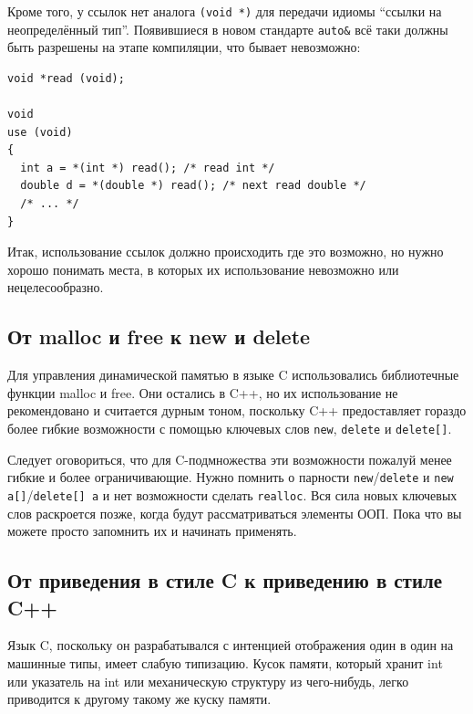 \documentclass[a4paper,12pt,oneside]{article}
\begin{document}
Кроме того, у ссылок нет аналога \lstinline!(void *)! для передачи идиомы ``ссылки на неопределённый тип''. Появившиеся в новом стандарте \lstinline!auto&! всё таки должны быть разрешены на этапе компиляции, что бывает невозможно:

\begin{lstlisting}
void *read (void);

void 
use (void)
{
  int a = *(int *) read(); /* read int */
  double d = *(double *) read(); /* next read double */
  /* ... */
}
\end{lstlisting}

Итак, использование ссылок должно происходить где это возможно, но нужно хорошо понимать места, в которых их использование невозможно или нецелесообразно.

\subsection{От malloc и free к new и delete\label{newdelete}}

Для управления динамической памятью в языке C использовались библиотечные функции malloc и free. Они остались в C++, но их использование не рекомендовано и считается дурным тоном, поскольку C++ предоставляет гораздо более гибкие возможности с помощью ключевых слов \lstinline!new!, \lstinline!delete! и \lstinline!delete[]!.



Следует оговориться, что для C-подмножества эти возможности пожалуй менее гибкие и более ограничивающие. Нужно помнить о парности \lstinline!new!/\lstinline!delete! и \lstinline!new a[]!/\lstinline!delete[] a! и нет возможности сделать \lstinline!realloc!. Вся сила новых ключевых слов раскроется позже, когда будут рассматриваться элементы ООП. Пока что вы можете просто запомнить их и начинать применять.

\subsection{От приведения в стиле C к приведению в стиле C++}

Язык C, поскольку он разрабатывался с интенцией отображения один в один на машинные типы, имеет слабую типизацию. Кусок памяти, который хранит int или указатель на int или механическую структуру из чего-нибудь, легко приводится к другому такому же куску памяти.


\end{document}
